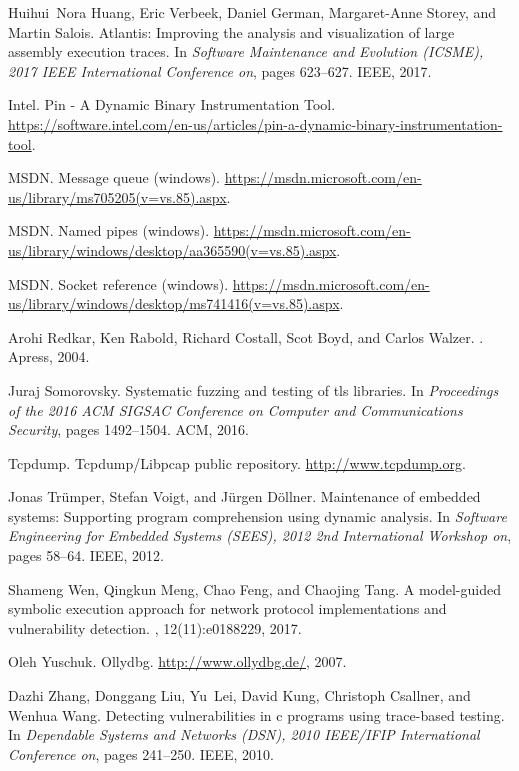 \documentclass[12pt,oneside]{book}
\providecommand{\DIFaddbegin}{} %
\newcommand{\DIFaddincludegraphics}[2][]{{\color{blue}\fbox{\DIFOincludegraphics[#1]{#2}}}} %
\DeclareRobustCommand{\DIFaddbegin}{\DIFOaddbegin \let\includegraphics\DIFaddincludegraphics} %
\begin{document}
\begin{thebibliography}{10}
Huihui~Nora Huang, Eric Verbeek, Daniel German, Margaret-Anne Storey, and
  Martin Salois.
\newblock Atlantis: Improving the analysis and visualization of large assembly
  execution traces.
\newblock In {\em Software Maintenance and Evolution (ICSME), 2017 IEEE
  International Conference on}, pages 623--627. IEEE, 2017.

Intel.
\newblock Pin - {A} {Dynamic} {Binary} {Instrumentation} {Tool}.
\newblock
  \url{https://software.intel.com/en-us/articles/pin-a-dynamic-binary-instrumentation-tool}.

\DIFaddbegin 



MSDN.
\newblock Message queue (windows).
\newblock
  \url{https://msdn.microsoft.com/en-us/library/ms705205(v=vs.85).aspx}.

MSDN.
\newblock Named pipes (windows).
\newblock
  \url{https://msdn.microsoft.com/en-us/library/windows/desktop/aa365590(v=vs.85).aspx}.

MSDN.
\newblock Socket reference (windows).
\newblock
  \url{https://msdn.microsoft.com/en-us/library/windows/desktop/ms741416(v=vs.85).aspx}.

Arohi Redkar, Ken Rabold, Richard Costall, Scot Boyd, and Carlos Walzer.
.
\newblock Apress, 2004.

Juraj Somorovsky.
\newblock Systematic fuzzing and testing of tls libraries.
\newblock In {\em Proceedings of the 2016 ACM SIGSAC Conference on Computer and
  Communications Security}, pages 1492--1504. ACM, 2016.

Tcpdump.
\newblock Tcpdump/{Libpcap} public repository.
\newblock \url{http://www.tcpdump.org}.

Jonas Tr{\"u}mper, Stefan Voigt, and J{\"u}rgen D{\"o}llner.
\newblock Maintenance of embedded systems: Supporting program comprehension
  using dynamic analysis.
\newblock In {\em Software Engineering for Embedded Systems (SEES), 2012 2nd
  International Workshop on}, pages 58--64. IEEE, 2012.

Shameng Wen, Qingkun Meng, Chao Feng, and Chaojing Tang.
\newblock A model-guided symbolic execution approach for network protocol
  implementations and vulnerability detection.
, 12(11):e0188229, 2017.

Oleh Yuschuk.
\newblock Ollydbg.
\newblock \url{http://www.ollydbg.de/}, 2007.

Dazhi Zhang, Donggang Liu, Yu~Lei, David Kung, Christoph Csallner, and Wenhua
  Wang.
\newblock Detecting vulnerabilities in c programs using trace-based testing.
\newblock In {\em Dependable Systems and Networks (DSN), 2010 IEEE/IFIP
  International Conference on}, pages 241--250. IEEE, 2010.

\end{thebibliography}
\end{document}
